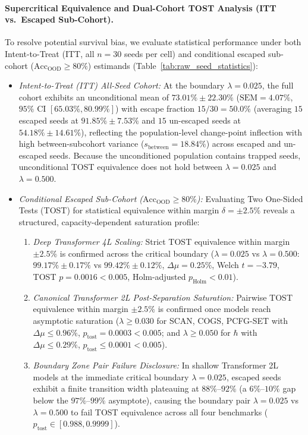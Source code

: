 \documentclass{article}
\theoremstyle{plain}
\theoremstyle{definition}
\begin{document}
\paragraph{Supercritical Equivalence and Dual-Cohort TOST Analysis (ITT vs.\ Escaped Sub-Cohort).}
To resolve potential survival bias, we evaluate statistical performance under both Intent-to-Treat (ITT, all $n=30$ seeds per cell) and conditional escaped sub-cohort ($\text{Acc}_{\text{OOD}} \ge 80\%$) estimands (Table~\ref{tab:raw_seed_statistics}):
\begin{itemize}[noitemsep]
    \item \emph{Intent-to-Treat (ITT) All-Seed Cohort:} At the boundary $\lambda = 0.025$, the full cohort exhibits an unconditional mean of $73.01\% \pm 22.30\%$ ($\text{SEM} = 4.07\%$, $95\%$ CI $[65.03\%, 80.99\%]$) with escape fraction $15/30 = 50.0\%$ (averaging $15$ escaped seeds at $91.85\% \pm 7.53\%$ and $15$ un-escaped seeds at $54.18\% \pm 14.61\%$), reflecting the population-level change-point inflection with high between-subcohort variance ($s_{\text{between}} = 18.84\%$) across escaped and un-escaped seeds. Because the unconditioned population contains trapped seeds, unconditional TOST equivalence does not hold between $\lambda = 0.025$ and $\lambda = 0.500$.
    \item \emph{Conditional Escaped Sub-Cohort ($\text{Acc}_{\text{OOD}} \ge 80\%$):} Evaluating Two One-Sided Tests (TOST) for statistical equivalence within margin $\delta = \pm 2.5\%$ reveals a structured, capacity-dependent saturation profile:
    \begin{enumerate}[label=(\alph*),noitemsep]
        \item \emph{Deep Transformer 4L Scaling:} Strict TOST equivalence within margin $\pm 2.5\%$ is confirmed across the critical boundary ($\lambda=0.025$ vs $\lambda=0.500$: $99.17\% \pm 0.17\%$ vs $99.42\% \pm 0.12\%$, $\Delta\mu = 0.25\%$, Welch $t = -3.79$, TOST $p = 0.0016 < 0.005$, Holm-adjusted $p_{\text{Holm}} < 0.01$).
        \item \emph{Canonical Transformer 2L Post-Separation Saturation:} Pairwise TOST equivalence within margin $\pm 2.5\%$ is confirmed once models reach asymptotic saturation ($\lambda \ge 0.030$ for SCAN, COGS, PCFG-SET with $\Delta\mu \le 0.96\%$, $p_{\text{tost}} = 0.0003 < 0.005$; and $\lambda \ge 0.050$ for $\hbar$ with $\Delta\mu \le 0.29\%$, $p_{\text{tost}} \le 0.0001 < 0.005$).
        \item \emph{Boundary Zone Pair Failure Disclosure:} In shallow Transformer 2L models at the immediate critical boundary $\lambda = 0.025$, escaped seeds exhibit a finite transition width plateauing at $88\%$--$92\%$ (a $6\%$--$10\%$ gap below the $97\%$--$99\%$ asymptote), causing the boundary pair $\lambda=0.025$ vs $\lambda=0.500$ to fail TOST equivalence across all four benchmarks ($p_{\text{tost}} \in [0.988, 0.9999]$).
    \end{enumerate}
\end{itemize}
\end{document}
